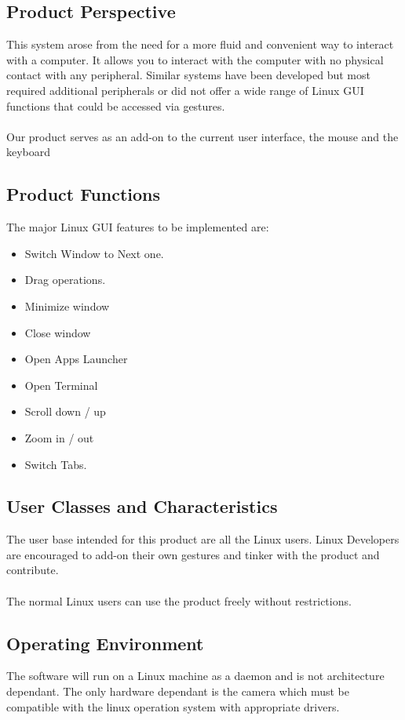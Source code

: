 \documentclass[11pt]{report}
\begin{document}
\subsection{Product Perspective}

This system arose from the need for a more fluid and convenient way to interact with a computer. It allows you to interact with the computer with no physical contact with any peripheral. Similar systems have been developed but most required additional peripherals or did not offer a wide range of Linux GUI functions that could be accessed via gestures.
\\
\\Our product serves as an add-on to the current user interface, the mouse and the keyboard  

\subsection{Product Functions}
The major Linux GUI features to be implemented are:
\begin{itemize}
    \item Switch Window to Next one.
    \item Drag operations. 
    \item Minimize window
    \item Close window
    \item Open Apps Launcher
    \item Open Terminal
    \item Scroll down / up
    \item Zoom in / out
    \item Switch Tabs.
\end{itemize}

\subsection{User Classes and Characteristics}
The user base intended for this product are all the Linux users. Linux Developers are encouraged to add-on their own gestures and tinker with the product and contribute.
\\
\\The normal Linux users can use the product freely without restrictions.

\subsection{Operating Environment}
The software will run on a Linux machine as a daemon and is not architecture dependant. The only hardware dependant is the camera which must be compatible with the linux operation system with appropriate drivers.
\end{document}
